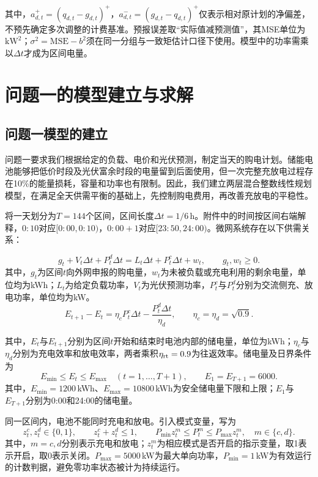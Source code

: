\documentclass[withoutpreface,bwprint]{cumcmthesis}
\begin{document}
其中，$a^+_{d,t}=(q_{d,t}-g_{d,t})^+$，$a^-_{d,t}=(g_{d,t}-q_{d,t})^+$仅表示相对原计划的净偏差，不预先确定多次调整的计费基准。预报误差取“实际值减预测值”，其MSE单位为$\mathrm{kW}^2$；$\sigma^2=\mathrm{MSE}-b^2$须在同一分组与一致矩估计口径下使用。模型中的功率需乘以$\Delta t$才成为区间电量。
\clearpage
\endgroup

\section{问题一的模型建立与求解}
\label{sec:q1}
\subsection{问题一模型的建立}
问题一要求我们根据给定的负载、电价和光伏预测，制定当天的购电计划。储能电池能够把低价时段及光伏富余时段的电量留到后面使用，但一次完整充放电过程存在10\%的能量损耗，容量和功率也有限制。因此，我们建立两层混合整数线性规划模型，在满足全天供需平衡的基础上，先控制购电费用，再改善充放电的平稳性。

将一天划分为$T=144$个区间，区间长度$\Delta t=1/6$\,h。附件中的时间按区间右端解释，$0{:}10$对应$[0{:}00,0{:}10)$，$0{:}00+1$对应$[23{:}50,24{:}00)$。微网系统存在以下供需关系：

\begin{equation}
 g_t+V_t\Delta t+P_t^d\Delta t
 =L_t\Delta t+P_t^c\Delta t+w_t,\qquad g_t,w_t\geq0 .
 \label{eq:q1-balance}
\end{equation}
其中，$g_t$为区间$t$向外网申报的购电量，$w_t$为未被负载或充电利用的剩余电量，单位均为kWh；$L_t$为给定负载功率，$V_t$为光伏预测功率，$P_t^c$与$P_t^d$分别为交流侧充、放电功率，单位均为kW。
\begin{equation}
 E_{t+1}-E_t=\eta_cP_t^c\Delta t-\frac{P_t^d\Delta t}{\eta_d},
 \qquad \eta_c=\eta_d=\sqrt{0.9}.
 \label{eq:q1-state}
\end{equation}

其中，$E_t$与$E_{t+1}$分别为区间$t$开始和结束时电池内部的储电量，单位为kWh；$\eta_c$与$\eta_d$分别为充电效率和放电效率，两者乘积$\eta_{\rm rt}=0.9$为往返效率。储电量及日界条件为
\begin{equation}
 E_{\min}\leq E_t\leq E_{\max}\quad(t=1,\ldots,T+1),\qquad E_1=E_{T+1}=6000.
 \label{eq:q1-boundary}
\end{equation}
其中，$E_{\min}=1200$\,kWh、$E_{\max}=10800$\,kWh为安全储电量下限和上限；$E_1$与$E_{T+1}$分别为0:00和24:00的储电量。

同一区间内，电池不能同时充电和放电。引入模式变量，写为
\begin{equation}
 z_t^c,z_t^d\in\{0,1\},\qquad z_t^c+z_t^d\leq1,\qquad
 P_{\min}z_t^m\leq P_t^m\leq P_{\max}z_t^m,\quad m\in\{c,d\}.
 \label{eq:q1-mode-power}
\end{equation}
其中，$m=c,d$分别表示充电和放电；$z_t^m$为相应模式是否开启的指示变量，取1表示开启，取0表示关闭。$P_{\max}=5000$\,kW为最大单向功率，$P_{\min}=1$\,kW为有效运行的计数判据，避免零功率状态被计为持续运行。
\end{document}
